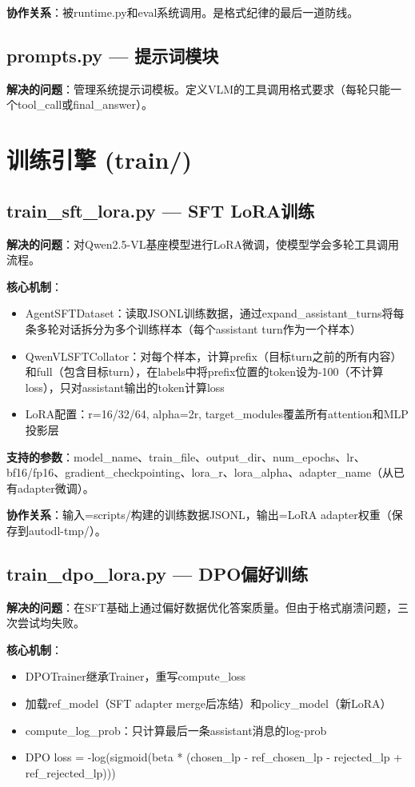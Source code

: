 \documentclass[fontset=none,11pt,a4paper]{ctexart}
\begin{document}
\textbf{协作关系}：被runtime.py和eval系统调用。是格式纪律的最后一道防线。

\subsection{prompts.py --- 提示词模块}

\textbf{解决的问题}：管理系统提示词模板。定义VLM的工具调用格式要求（每轮只能一个tool\_call或final\_answer）。

\section{训练引擎 (train/)}

\subsection{train\_sft\_lora.py --- SFT LoRA训练}

\textbf{解决的问题}：对Qwen2.5-VL基座模型进行LoRA微调，使模型学会多轮工具调用流程。

\textbf{核心机制}：
\begin{itemize}[nosep]
    \item AgentSFTDataset：读取JSONL训练数据，通过expand\_assistant\_turns将每条多轮对话拆分为多个训练样本（每个assistant turn作为一个样本）
    \item QwenVLSFTCollator：对每个样本，计算prefix（目标turn之前的所有内容）和full（包含目标turn），在labels中将prefix位置的token设为-100（不计算loss），只对assistant输出的token计算loss
    \item LoRA配置：r=16/32/64, alpha=2r, target\_modules覆盖所有attention和MLP投影层
\end{itemize}

\textbf{支持的参数}：model\_name、train\_file、output\_dir、num\_epochs、lr、bf16/fp16、gradient\_checkpointing、lora\_r、lora\_alpha、adapter\_name（从已有adapter微调）。

\textbf{协作关系}：输入=scripts/构建的训练数据JSONL，输出=LoRA adapter权重（保存到autodl-tmp/）。

\subsection{train\_dpo\_lora.py --- DPO偏好训练}

\textbf{解决的问题}：在SFT基础上通过偏好数据优化答案质量。但由于格式崩溃问题，三次尝试均失败。

\textbf{核心机制}：
\begin{itemize}[nosep]
    \item DPOTrainer继承Trainer，重写compute\_loss
    \item 加载ref\_model（SFT adapter merge后冻结）和policy\_model（新LoRA）
    \item compute\_log\_prob：只计算最后一条assistant消息的log-prob
    \item DPO loss = -log(sigmoid(beta * (chosen\_lp - ref\_chosen\_lp - rejected\_lp + ref\_rejected\_lp)))
\end{itemize}
\end{document}
